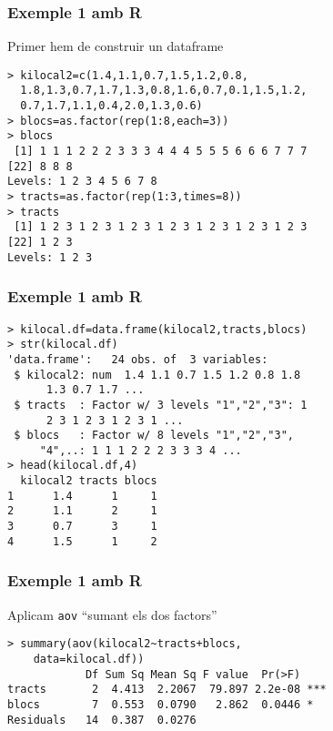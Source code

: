 \documentclass[12pt,t]{beamer}
\theoremstyle{plain}
\theoremstyle{definition}
\begin{document}
\begin{frame}[fragile]
\frametitle{Exemple 1 amb R}

Primer hem de construir un dataframe
\begin{verbatim}
> kilocal2=c(1.4,1.1,0.7,1.5,1.2,0.8,
  1.8,1.3,0.7,1.7,1.3,0.8,1.6,0.7,0.1,1.5,1.2,
  0.7,1.7,1.1,0.4,2.0,1.3,0.6)
> blocs=as.factor(rep(1:8,each=3))
> blocs
 [1] 1 1 1 2 2 2 3 3 3 4 4 4 5 5 5 6 6 6 7 7 7
[22] 8 8 8
Levels: 1 2 3 4 5 6 7 8
> tracts=as.factor(rep(1:3,times=8))
> tracts
 [1] 1 2 3 1 2 3 1 2 3 1 2 3 1 2 3 1 2 3 1 2 3 
[22] 1 2 3
Levels: 1 2 3
\end{verbatim}
\end{frame}



\begin{frame}[fragile]
\frametitle{Exemple 1 amb R}
\vspace*{-2ex}

\begin{verbatim}
> kilocal.df=data.frame(kilocal2,tracts,blocs)
> str(kilocal.df)
'data.frame':	24 obs. of  3 variables:
 $ kilocal2: num  1.4 1.1 0.7 1.5 1.2 0.8 1.8 
      1.3 0.7 1.7 ...
 $ tracts  : Factor w/ 3 levels "1","2","3": 1 
      2 3 1 2 3 1 2 3 1 ...
 $ blocs   : Factor w/ 8 levels "1","2","3",
     "4",..: 1 1 1 2 2 2 3 3 3 4 ...
> head(kilocal.df,4)
  kilocal2 tracts blocs
1      1.4      1     1
2      1.1      2     1
3      0.7      3     1
4      1.5      1     2
\end{verbatim}
\end{frame}


\begin{frame}[fragile]
\frametitle{Exemple 1 amb R}
Aplicam \texttt{aov} ``sumant els dos factors''
{\small 
\begin{verbatim}
> summary(aov(kilocal2~tracts+blocs,
    data=kilocal.df))
            Df Sum Sq Mean Sq F value  Pr(>F)    
tracts       2  4.413  2.2067  79.897 2.2e-08 ***
blocs        7  0.553  0.0790   2.862  0.0446 *  
Residuals   14  0.387  0.0276                    
\end{verbatim}
}
\end{frame}
\end{document}
